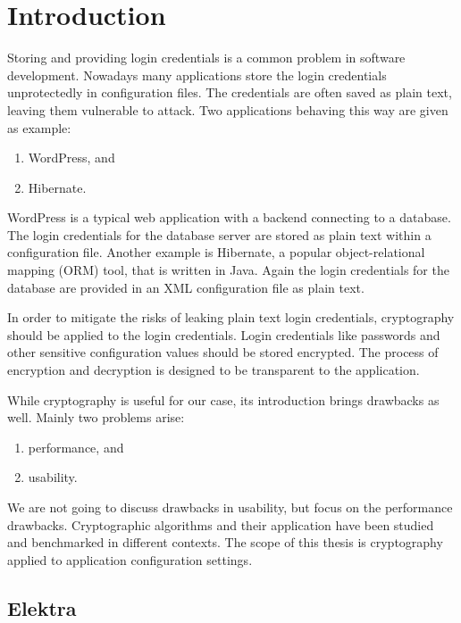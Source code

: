 \chapter{Introduction}

Storing and providing login credentials is a common problem in software development.
Nowadays many applications store the login credentials unprotectedly in configuration files.
The credentials are often saved as plain text, leaving them vulnerable to attack.
Two applications behaving this way are given as example:

\begin{enumerate}
\item WordPress, and
\item Hibernate.
\end{enumerate}

WordPress is a typical web application with a backend connecting to a database.
The login credentials for the database server are stored as plain text within a configuration file.\cite{wordpress-doc}
Another example is Hibernate, a popular object-relational mapping (ORM) tool, that is written in Java.
Again the login credentials for the database are provided in an XML configuration file as plain text.\cite{hibernate-doc}

In order to mitigate the risks of leaking plain text login credentials, cryptography should be applied to the login credentials.
Login credentials like passwords and other sensitive configuration values should be stored encrypted.
The process of encryption and decryption is designed to be transparent to the application.

While cryptography is useful for our case, its introduction brings drawbacks as well.
Mainly two problems arise:
\begin{enumerate}
\item performance, and
\item usability.
\end{enumerate}

We are not going to discuss drawbacks in usability, but focus on the performance drawbacks.
Cryptographic algorithms and their application have been studied and benchmarked in different contexts.\cite{ocf,freebsdtls,thakur2011aes}
The scope of this thesis is cryptography applied to application configuration settings.

\section{Elektra}

